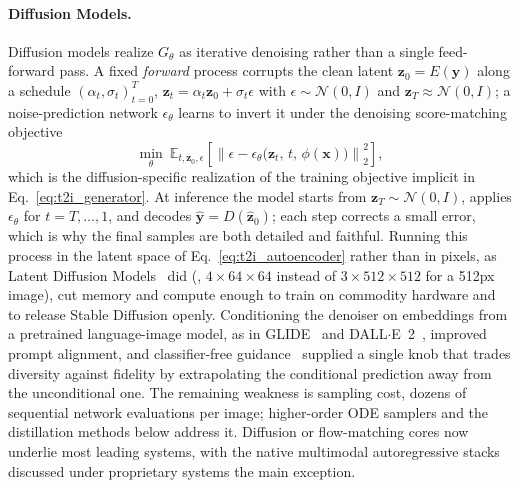 \paragraph{Diffusion Models.}\label{para:p3_s8_1_1_diffusion}
Diffusion models realize $G_\theta$ as iterative denoising rather than a single feed-forward pass.
A fixed \emph{forward} process corrupts the clean latent $\mathbf{z}_0=E(\mathbf{y})$ along a schedule $(\alpha_t,\sigma_t)_{t=0}^{T}$, $\mathbf{z}_t=\alpha_t \mathbf{z}_0+\sigma_t\epsilon$ with $\epsilon\sim\mathcal{N}(0,I)$ and $\mathbf{z}_T\!\approx\!\mathcal{N}(0,I)$; a noise-prediction network $\epsilon_\theta$ learns to invert it under the denoising score-matching objective
\begin{equation}
\min_\theta\ \mathbb{E}_{t,\mathbf{z}_0,\epsilon}\!\left[\left\|\epsilon-\epsilon_\theta\!\big(\mathbf{z}_t,\,t,\,\phi(\mathbf{x})\big)\right\|_2^2\right],
\label{eq:t2i_ldm_objective}
\end{equation}
which is the diffusion-specific realization of the training objective implicit in Eq.~\eqref{eq:t2i_generator}.
At inference the model starts from $\mathbf{z}_T\sim\mathcal{N}(0,I)$, applies $\epsilon_\theta$ for $t=T,\dots,1$, and decodes $\hat{\mathbf{y}}=D(\hat{\mathbf{z}}_0)$; each step corrects a small error, which is why the final samples are both detailed and faithful.
Running this process in the latent space of Eq.~\eqref{eq:t2i_autoencoder} rather than in pixels, as Latent Diffusion Models~\cite{rombach2022ldm} did (\eg, $4\times64\times64$ instead of $3\times512\times512$ for a 512px image), cut memory and compute enough to train on commodity hardware and to release Stable Diffusion openly.
Conditioning the denoiser on embeddings from a pretrained language-image model, as in GLIDE~\cite{glide2022} and DALL$\cdot$E~2~\cite{dalle2_2022}, improved prompt alignment, and classifier-free guidance~\cite{ho2022classifierfree} supplied a single knob that trades diversity against fidelity by extrapolating the conditional prediction away from the unconditional one.
The remaining weakness is sampling cost, dozens of sequential network evaluations per image; higher-order ODE samplers and the distillation methods below address it.
Diffusion or flow-matching cores now underlie most leading systems, with the native multimodal autoregressive stacks discussed under proprietary systems the main exception.

